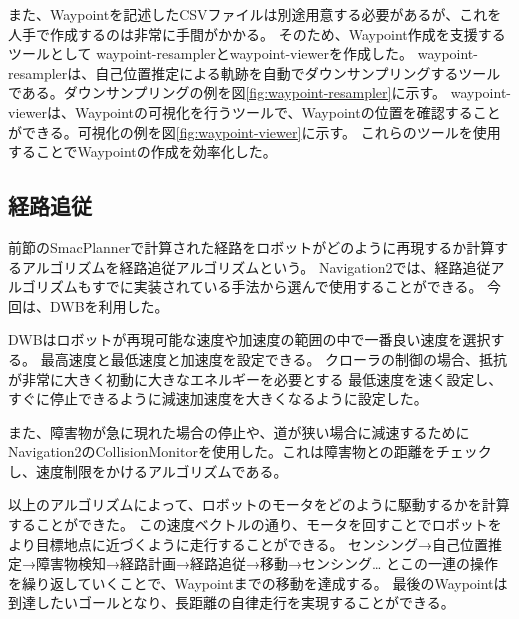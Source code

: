 また、Waypointを記述したCSVファイルは別途用意する必要があるが、これを人手で作成するのは非常に手間がかかる。
そのため、Waypoint作成を支援するツールとして waypoint-resamplerとwaypoint-viewer\cite{waypointmodifier}を作成した。
waypoint-resamplerは、自己位置推定による軌跡を自動でダウンサンプリングするツールである。ダウンサンプリングの例を図\ref{fig:waypoint-resampler}に示す。
waypoint-viewerは、Waypointの可視化を行うツールで、Waypointの位置を確認することができる。可視化の例を図\ref{fig:waypoint-viewer}に示す。
これらのツールを使用することでWaypointの作成を効率化した。

\subsection{経路追従}
前節のSmacPlannerで計算された経路をロボットがどのように再現するか計算するアルゴリズムを経路追従アルゴリズムという。
Navigation2では、経路追従アルゴリズムもすでに実装されている手法から選んで使用することができる。
今回は、DWBを利用した。

DWBはロボットが再現可能な速度や加速度の範囲の中で一番良い速度を選択する。
最高速度と最低速度と加速度を設定できる。
クローラの制御の場合、抵抗が非常に大きく初動に大きなエネルギーを必要とする
最低速度を速く設定し、すぐに停止できるように減速加速度を大きくなるように設定した。

また、障害物が急に現れた場合の停止や、道が狭い場合に減速するためにNavigation2のCollisionMonitorを使用した。これは障害物との距離をチェックし、速度制限をかけるアルゴリズムである。

以上のアルゴリズムによって、ロボットのモータをどのように駆動するかを計算することができた。
この速度ベクトルの通り、モータを回すことでロボットをより目標地点に近づくように走行することができる。
センシング→自己位置推定→障害物検知→経路計画→経路追従→移動→センシング…
とこの一連の操作を繰り返していくことで、Waypointまでの移動を達成する。
最後のWaypointは到達したいゴールとなり、長距離の自律走行を実現することができる。

